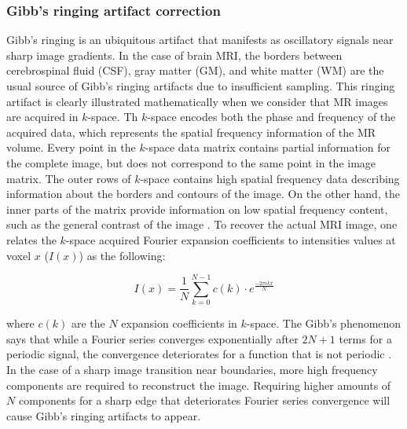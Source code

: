\subsubsection{Gibb's ringing artifact correction}
Gibb's ringing is an ubiquitous artifact that manifests as oscillatory signals near sharp image gradients. In the case of brain MRI, the borders between cerebrospinal fluid (CSF), gray matter (GM), and white matter (WM) are the usual source of Gibb's ringing artifacts due to insufficient sampling. This ringing artifact is clearly illustrated mathematically when we consider that MR images are acquired in $k$-space. Th $k$-space encodes both the phase and frequency of the acquired data, which represents the spatial frequency information of the MR volume. Every point in the $k$-space data matrix contains partial information for the complete image, but does not correspond to the same point in the image matrix. The outer rows of $k$-space contains high spatial frequency data describing information about the borders and contours of the image. On the other hand, the inner parts of the matrix provide information on low spatial frequency content, such as the general contrast of the image \cite{bronzino2000biomedical,mezrich1995perspective}. To recover the actual MRI image, one relates the $k$-space acquired Fourier expansion coefficients to intensities values at voxel $x$ ($I(x)$) as the following: 

\begin{equation}
\label{eq:ktransform}
I(x) = \frac{1}{N} \sum_{k=0}^{N-1} c(k) \cdot e^{\frac{-2 \pi i k x}{N}}
\end{equation}

where $c(k)$ are the $N$ expansion coefficients in $k$-space. The Gibb's phenomenon says that while a Fourier series converges exponentially after $2N+1$ terms for a periodic signal, the convergence deteriorates for a function that is not periodic \cite{gottlieb_gibbs_1992}. In the case of a sharp image transition near boundaries, more high frequency components are required to reconstruct the image. Requiring higher amounts of $N$ components for a sharp edge that deteriorates Fourier series convergence will cause Gibb's ringing artifacts to appear. 

